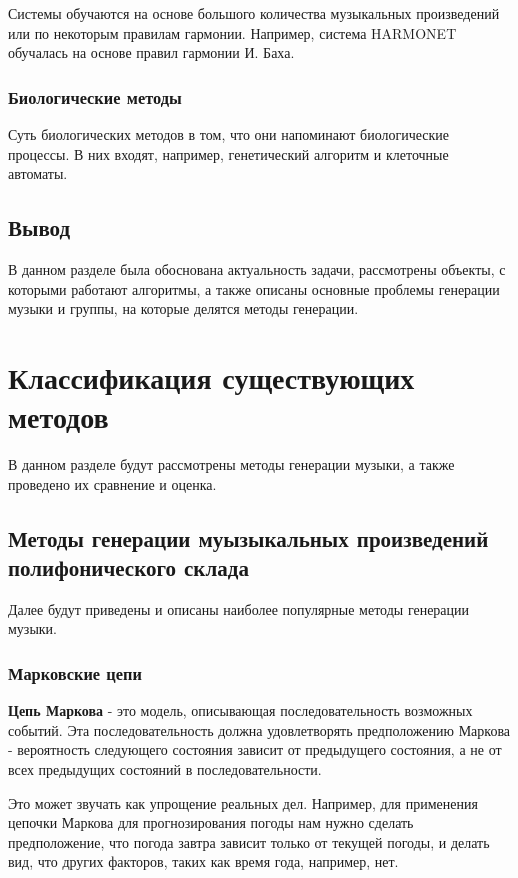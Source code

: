 Системы обучаются на основе большого количества музыкальных произведений или по некоторым правилам гармонии. Например, система \linebreak HARMONET обучалась на основе правил гармонии И. Баха.


\subsection{Биологические методы}

Суть биологических методов в том, что они напоминают биологические процессы. В них входят, например, генетический алгоритм и клеточные автоматы.

\section{Вывод}

В данном разделе была обоснована актуальность задачи, рассмотрены объекты, с которыми работают алгоритмы, а также описаны основные проблемы генерации музыки и группы, на которые делятся методы генерации.


\chapter{Классификация существующих методов}

В данном разделе будут рассмотрены методы генерации музыки, а также проведено их сравнение и оценка.

\section{Методы генерации муызыкальных произведений полифонического склада}

Далее будут приведены и описаны наиболее популярные методы генерации музыки.

\subsection{Марковские цепи}

\textbf{Цепь Маркова} - это модель, описывающая последовательность возможных событий. Эта последовательность должна удовлетворять предположению Маркова - вероятность следующего состояния зависит от предыдущего состояния, а не от всех предыдущих состояний в последовательности.

Это может звучать как упрощение реальных дел. Например, для применения цепочки Маркова для прогнозирования погоды нам нужно сделать предположение, что погода завтра зависит только от текущей погоды, и делать вид, что других факторов, таких как время года, например, нет.


